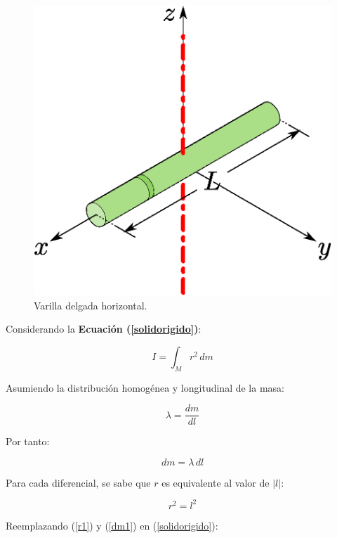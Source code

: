 \documentclass[letter,oneside,11pt]{article}
\begin{document}
\begin{figure}
\centering
\includegraphics[scale=0.5]{resources/f6.eps}
\caption{Varilla delgada horizontal.}
\label{figura6}
\end{figure}

Considerando la \textbf{Ecuación (\ref{solidorigido})}:

\begin{equation*}
    I = \int_{M} r^2\, dm
\tag{4}
\end{equation*}

Asumiendo la distribución homogénea y longitudinal de la masa:

\begin{equation*}
    \lambda = \frac{dm}{dl}
\end{equation*}

Por tanto:

\begin{equation}
    dm = \lambda\, dl
\label{dm1}
\end{equation}

Para cada diferencial, se sabe que $r$ es equivalente al valor de
$|l|$:

\begin{equation}
    r^2 = l^2
\label{r1}
\end{equation}

Reemplazando (\ref{r1}) y (\ref{dm1}) en (\ref{solidorigido}):
\end{document}
